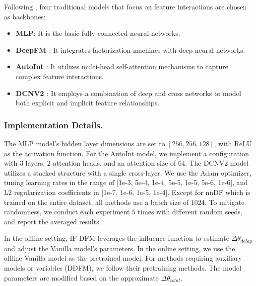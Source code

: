 Following \cite{wang2023unbiased}, four traditional models that focus on feature interactions are chosen as backbones:
\begin{itemize}[leftmargin=*]
    \item \textbf{MLP}: It is the basic fully connected neural networks.
    \item \textbf{DeepFM \cite{guo2017deepfm}}: It integrates factorization machines with deep neural networks.
    \item \textbf{AutoInt \cite{song2019autoint}}: It utilizes multi-head self-attention mechanisms to capture complex feature interactions.
    \item \textbf{DCNV2 \cite{wang2021dcn}}: It employs a combination of deep and cross networks to model both explicit and implicit feature relationships.
\end{itemize}

\subsubsection{Implementation Details.}
The MLP model's hidden layer dimensions are set to $[256, 256, 128]$, with ReLU as the activation function. For the AutoInt model, we implement a configuration with $3$ layers, $2$ attention heads, and an attention size of $64$. The DCNV2 model utilizes a stacked structure with a single cross-layer. We use the Adam optimizer, tuning learning rates in the range of [1e-3, 5e-4, 1e-4, 5e-5, 1e-5, 5e-6, 1e-6], and L2 regularization coefficients in [1e-7, 1e-6, 1e-5, 1e-4]. Except for nnDF which is trained on the entire dataset, all methods use a batch size of $1024$. To mitigate randomness, we conduct each experiment $5$ times with different random seeds, and report the averaged results. 

In the offline setting, IF-DFM leverages the influence function to estimate $\Delta\theta_{delay}$ and adjust the Vanilla model's parameters. In the online setting, we use the offline Vanilla model as the pretrained model. For methods requiring auxiliary models or variables (\eg DDFM), we follow their pretraining methods. The model parameters are modified based on the approximate $\Delta\theta_{total}$.

